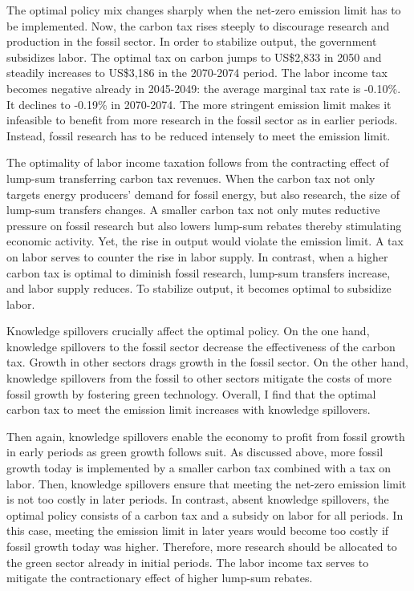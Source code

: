 The optimal policy mix changes sharply when the net-zero emission limit has to be implemented. Now, the carbon tax rises steeply to discourage research and production in the fossil sector. In order to stabilize output, the government subsidizes labor. The optimal tax on carbon jumps to US\$2,833 in 2050 and steadily increases to US\$3,186 in the 2070-2074 period. The labor income tax becomes negative already in 2045-2049: the average marginal tax rate is -0.10\%. It declines to -0.19\% in 2070-2074.
The more stringent emission limit makes it infeasible to benefit from more research in the fossil sector as in earlier periods. Instead, fossil research has to be reduced intensely to meet the emission limit. 



The optimality of labor income taxation follows from the contracting effect of lump-sum transferring carbon tax revenues. When the carbon tax not only targets energy producers’ demand for fossil energy, but also research, the size of lump-sum transfers changes. A smaller carbon tax not only mutes reductive pressure on fossil research but also lowers lump-sum rebates thereby stimulating economic activity. Yet, the rise in output would violate the emission limit. A tax on labor serves to counter the rise in labor supply. In contrast, when a higher carbon tax is optimal to diminish fossil research, lump-sum transfers increase, and labor supply reduces. To stabilize output, it becomes optimal to subsidize labor. 

Knowledge spillovers crucially affect the optimal policy.  On the one hand, knowledge spillovers to the fossil sector decrease the effectiveness of the carbon tax. Growth in other sectors drags growth in the fossil sector. On the other hand, knowledge spillovers from the fossil to other sectors mitigate the costs of more fossil growth by fostering green technology. 
Overall, I find that the optimal carbon tax to meet the emission limit increases with knowledge spillovers.
 
Then again, knowledge spillovers enable the economy to profit from fossil growth in early periods as green growth follows suit.  As discussed above, more fossil growth today is implemented by a smaller carbon tax combined with a tax on labor. Then, knowledge spillovers ensure that meeting the net-zero emission limit is not too costly in later periods. 
In contrast, absent knowledge spillovers, the optimal policy consists of a carbon tax and a subsidy on labor for all periods. In this case, meeting the emission limit in later years would become too costly if fossil growth today was higher. Therefore, more research should be allocated to the green sector already in initial periods. The labor income tax serves to mitigate the contractionary effect of higher lump-sum rebates. 

